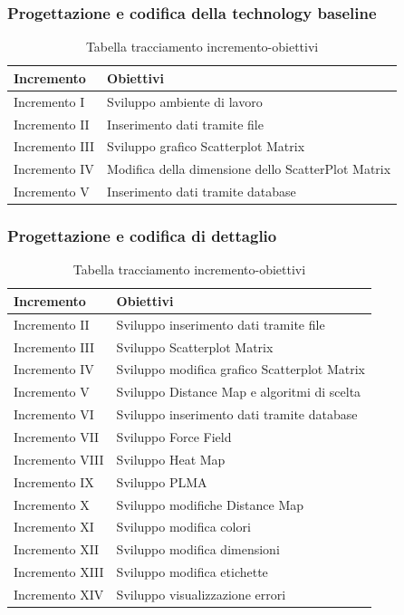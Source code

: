 \documentclass[../piano_di_progetto.tex]{subfiles}
\begin{document}
\subsubsection*{Progettazione e codifica della technology baseline}
\begin{table}[!ht]
	\centering
	\begin{tabular}{|p{3cm}|p{6.5cm}|}
	\hline
	\rowcolor{lightgray}
    \textbf{Incremento} & \textbf{Obiettivi}\\
    \hline
        Incremento I & Sviluppo ambiente di lavoro\\
        Incremento II & Inserimento dati tramite file\\
        Incremento III & Sviluppo grafico Scatterplot Matrix \\
        Incremento IV & Modifica della dimensione dello ScatterPlot Matrix\\
        Incremento V & Inserimento dati tramite database\\
    \hline
    \end{tabular}
    \caption{Tabella tracciamento incremento-obiettivi}
\end{table}

\subsubsection*{Progettazione e codifica di dettaglio}
\begin{table}[!ht]
	\centering
	\begin{tabular}{|p{3cm}|p{6.5cm}|}
	\hline
	\rowcolor{lightgray}
    \textbf{Incremento} & \textbf{Obiettivi}\\
    \hline
        Incremento II & Sviluppo inserimento dati tramite file \\
        Incremento III & Sviluppo Scatterplot Matrix \\
        Incremento IV & Sviluppo modifica grafico Scatterplot Matrix \\
        Incremento V & Sviluppo Distance Map e algoritmi di scelta \\	
        Incremento VI & Sviluppo inserimento dati tramite database \\
        Incremento VII & Sviluppo Force Field \\
        Incremento VIII & Sviluppo Heat Map \\
        Incremento IX & Sviluppo PLMA \\
        Incremento X & Sviluppo modifiche Distance Map \\
        Incremento XI & Sviluppo modifica colori \\
        Incremento XII & Sviluppo modifica dimensioni \\
        Incremento XIII & Sviluppo modifica etichette \\
        Incremento XIV & Sviluppo visualizzazione errori \\        
    \hline	
	\end{tabular}
	\caption{Tabella tracciamento incremento-obiettivi}
\end{table}
\end{document}
